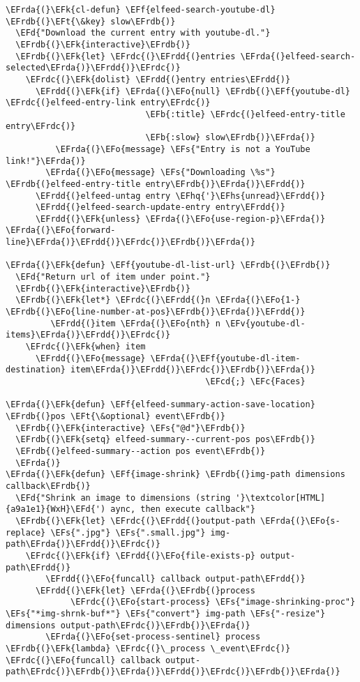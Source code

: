 \documentclass[a4wide,10pt]{article}
\newcommand{\EFc}[1]{\textcolor{EFc}{#1}} %
\newcommand{\EFcd}[1]{\textcolor{EFcd}{#1}} %
\newcommand{\EFs}[1]{\textcolor{EFs}{#1}} %
\newcommand{\EFd}[1]{\textcolor{EFd}{#1}} %
\newcommand{\EFk}[1]{\textcolor{EFk}{#1}} %
\newcommand{\EFb}[1]{\textcolor{EFb}{#1}} %
\newcommand{\EFf}[1]{\textcolor{EFf}{#1}} %
\newcommand{\EFv}[1]{\textcolor{EFv}{#1}} %
\newcommand{\EFt}[1]{\textcolor{EFt}{#1}} %
\newcommand{\EFo}[1]{\textcolor{EFo}{#1}} %
\newcommand{\EFhq}[1]{\textcolor{EFhq}{#1}} %
\newcommand{\EFhs}[1]{\textcolor{EFhs}{#1}} %
\newcommand{\EFrda}[1]{\textcolor{EFrda}{#1}} %
\newcommand{\EFrdb}[1]{\textcolor{EFrdb}{#1}} %
\newcommand{\EFrdc}[1]{\textcolor{EFrdc}{#1}} %
\newcommand{\EFrdd}[1]{\textcolor{EFrdd}{#1}} %
\begin{document}
\begin{Code}
\begin{Verbatim}
\EFrda{(}\EFk{cl-defun} \EFf{elfeed-search-youtube-dl} \EFrdb{(}\EFt{\&key} slow\EFrdb{)}
  \EFd{"Download the current entry with youtube-dl."}
  \EFrdb{(}\EFk{interactive}\EFrdb{)}
  \EFrdb{(}\EFk{let} \EFrdc{(}\EFrdd{(}entries \EFrda{(}elfeed-search-selected\EFrda{)}\EFrdd{)}\EFrdc{)}
    \EFrdc{(}\EFk{dolist} \EFrdd{(}entry entries\EFrdd{)}
      \EFrdd{(}\EFk{if} \EFrda{(}\EFo{null} \EFrdb{(}\EFf{youtube-dl} \EFrdc{(}elfeed-entry-link entry\EFrdc{)}
                            \EFb{:title} \EFrdc{(}elfeed-entry-title entry\EFrdc{)}
                            \EFb{:slow} slow\EFrdb{)}\EFrda{)}
          \EFrda{(}\EFo{message} \EFs{"Entry is not a YouTube link!"}\EFrda{)}
        \EFrda{(}\EFo{message} \EFs{"Downloading \%s"} \EFrdb{(}elfeed-entry-title entry\EFrdb{)}\EFrda{)}\EFrdd{)}
      \EFrdd{(}elfeed-untag entry \EFhq{'}\EFhs{unread}\EFrdd{)}
      \EFrdd{(}elfeed-search-update-entry entry\EFrdd{)}
      \EFrdd{(}\EFk{unless} \EFrda{(}\EFo{use-region-p}\EFrda{)} \EFrda{(}\EFo{forward-line}\EFrda{)}\EFrdd{)}\EFrdc{)}\EFrdb{)}\EFrda{)}

\EFrda{(}\EFk{defun} \EFf{youtube-dl-list-url} \EFrdb{(}\EFrdb{)}
  \EFd{"Return url of item under point."}
  \EFrdb{(}\EFk{interactive}\EFrdb{)}
  \EFrdb{(}\EFk{let*} \EFrdc{(}\EFrdd{(}n \EFrda{(}\EFo{1-} \EFrdb{(}\EFo{line-number-at-pos}\EFrdb{)}\EFrda{)}\EFrdd{)}
         \EFrdd{(}item \EFrda{(}\EFo{nth} n \EFv{youtube-dl-items}\EFrda{)}\EFrdd{)}\EFrdc{)}
    \EFrdc{(}\EFk{when} item
      \EFrdd{(}\EFo{message} \EFrda{(}\EFf{youtube-dl-item-destination} item\EFrda{)}\EFrdd{)}\EFrdc{)}\EFrdb{)}\EFrda{)}
                                        \EFcd{;} \EFc{Faces}

\EFrda{(}\EFk{defun} \EFf{elfeed-summary-action-save-location} \EFrdb{(}pos \EFt{\&optional} event\EFrdb{)}
  \EFrdb{(}\EFk{interactive} \EFs{"@d"}\EFrdb{)}
  \EFrdb{(}\EFk{setq} elfeed-summary--current-pos pos\EFrdb{)}
  \EFrdb{(}elfeed-summary--action pos event\EFrdb{)}
  \EFrda{)}
\EFrda{(}\EFk{defun} \EFf{image-shrink} \EFrdb{(}img-path dimensions callback\EFrdb{)}
  \EFd{"Shrink an image to dimensions (string '}\textcolor[HTML]{a9a1e1}{WxH}\EFd{') aync, then execute callback"}
  \EFrdb{(}\EFk{let} \EFrdc{(}\EFrdd{(}output-path \EFrda{(}\EFo{s-replace} \EFs{".jpg"} \EFs{".small.jpg"} img-path\EFrda{)}\EFrdd{)}\EFrdc{)}
    \EFrdc{(}\EFk{if} \EFrdd{(}\EFo{file-exists-p} output-path\EFrdd{)}
        \EFrdd{(}\EFo{funcall} callback output-path\EFrdd{)}
      \EFrdd{(}\EFk{let} \EFrda{(}\EFrdb{(}process
             \EFrdc{(}\EFo{start-process} \EFs{"image-shrinking-proc"} \EFs{"*img-shrnk-buf*"} \EFs{"convert"} img-path \EFs{"-resize"} dimensions output-path\EFrdc{)}\EFrdb{)}\EFrda{)}
        \EFrda{(}\EFo{set-process-sentinel} process \EFrdb{(}\EFk{lambda} \EFrdc{(}\_process \_event\EFrdc{)} \EFrdc{(}\EFo{funcall} callback output-path\EFrdc{)}\EFrdb{)}\EFrda{)}\EFrdd{)}\EFrdc{)}\EFrdb{)}\EFrda{)}


\end{Verbatim}
\end{Code}
\end{document}
